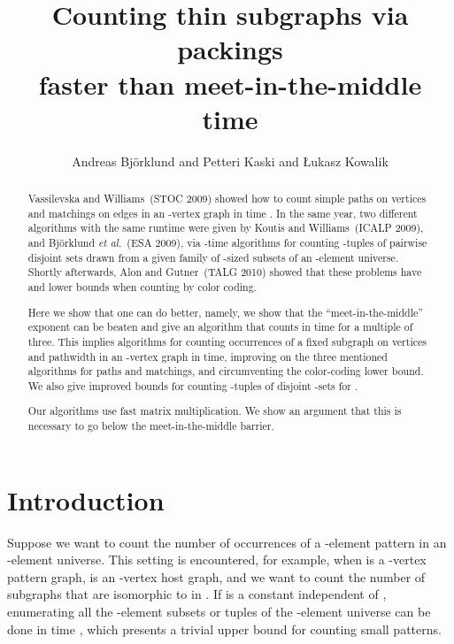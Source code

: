 \documentclass{amsart}
\begin{document}
\title []{Counting thin subgraphs via packings\\faster than meet-in-the-middle time}
\author []{Andreas Bj\"orklund and Petteri Kaski and \L ukasz Kowalik}

\begin{abstract}
Vassilevska and Williams~(STOC 2009) showed how to count simple paths on  vertices and matchings on  edges in an -vertex graph in time . In the same year, two different algorithms with the same runtime were given by Koutis and Williams~(ICALP 2009), and Bj\"orklund \emph{et al.}~(ESA 2009), via -time algorithms for counting -tuples of pairwise disjoint sets drawn from a given family of -sized subsets of an -element universe.
Shortly afterwards, Alon and Gutner~(TALG 2010) showed that these problems have  and  lower bounds when counting by color coding. 

Here we show that one can do better, namely, we show that the ``meet-in-the-middle'' exponent  can be beaten and give an algorithm that counts in time  for  a multiple of three. This implies algorithms for counting occurrences of a fixed subgraph on  vertices and pathwidth  in an -vertex graph in  time, improving on the three mentioned algorithms for paths and matchings, and circumventing the color-coding lower bound. 
We also give improved bounds for counting -tuples of disjoint -sets for . 

Our algorithms use fast matrix multiplication. We show an argument that this is necessary to go below the meet-in-the-middle barrier.
\end{abstract}

\maketitle




\section{Introduction}

Suppose we want to count the number of occurrences of a -element pattern 
in an -element universe. This setting is encountered, for example,
when  is a -vertex pattern graph,  is an -vertex host graph, and 
we want to count the number of subgraphs that are isomorphic to  in .
If  is a constant independent of , enumerating all the -element 
subsets or tuples of the -element universe can be done in time , 
which presents a trivial upper bound for counting small patterns. 
\end{document}
